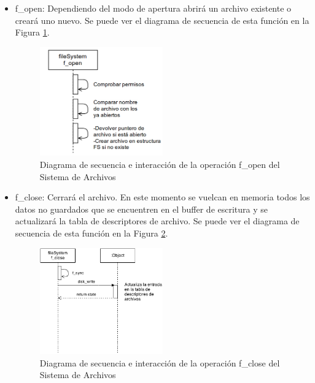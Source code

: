 \begin{itemize}
\item f\_open: Dependiendo del modo de apertura abrirá un archivo existente o creará uno nuevo. Se puede ver el diagrama de secuencia de esta función en la Figura \ref{fig:fopen}.\\

\begin{figure}[!h]
\begin{center}
\includegraphics[width=0.5\textwidth]{figs/fopen.png}
\caption{Diagrama de secuencia e interacción de la operación f\_open del Sistema de Archivos}
\label{fig:fopen}
\end{center}
\end{figure}

\item f\_close: Cerrará el archivo. En este momento se vuelcan en memoria todos los datos no guardados que se encuentren en el buffer de escritura y se actualizará la tabla de descriptores de archivo. Se puede ver el diagrama de secuencia de esta función en la Figura \ref{fig:fclose}.\\

\begin{figure}[!h]
\begin{center}
\includegraphics[width=0.5\textwidth]{figs/fclose.png}
\caption{Diagrama de secuencia e interacción de la operación f\_close del Sistema de Archivos}
\label{fig:fclose}
\end{center}
\end{figure}


\end{itemize}
